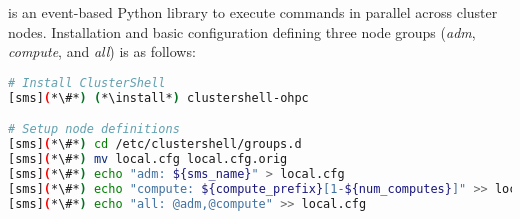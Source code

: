 \clustershell{} is an event-based Python library to execute commands in parallel
across cluster nodes. Installation and basic configuration defining three node
groups ({\em adm}, {\em compute}, and {\em all}) is as follows:

\begin{lstlisting}[language=bash,keywords={},upquote=true]
# Install ClusterShell
[sms](*\#*) (*\install*) clustershell-ohpc

# Setup node definitions
[sms](*\#*) cd /etc/clustershell/groups.d
[sms](*\#*) mv local.cfg local.cfg.orig
[sms](*\#*) echo "adm: ${sms_name}" > local.cfg
[sms](*\#*) echo "compute: ${compute_prefix}[1-${num_computes}]" >> local.cfg
[sms](*\#*) echo "all: @adm,@compute" >> local.cfg
\end{lstlisting}

